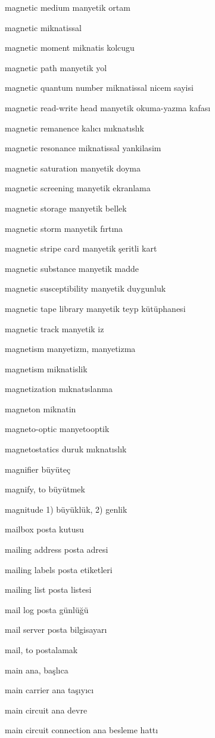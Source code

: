 \documentclass[12pt,fleqn]{article}\usepackage{../../common}
\begin{document}
magnetic medium manyetik ortam

magnetic miknatissal

magnetic moment miknatis kolcugu

magnetic path manyetik yol

magnetic quantum number miknatissal nicem sayisi

magnetic read-write head manyetik okuma-yazma kafası

magnetic remanence kalıcı mıknatıslık

magnetic resonance miknatissal yankilasim

magnetic saturation manyetik doyma

magnetic screening manyetik ekranlama

magnetic storage manyetik bellek

magnetic storm manyetik fırtına

magnetic stripe card manyetik şeritli kart

magnetic substance manyetik madde

magnetic susceptibility manyetik duygunluk

magnetic tape library manyetik teyp kütüphanesi

magnetic track manyetik iz

magnetism manyetizm, manyetizma

magnetism miknatislik

magnetization mıknatıslanma

magneton miknatin

magneto-optic manyetooptik

magnetostatics duruk mıknatıslık

magnifier büyüteç

magnify, to büyütmek

magnitude 1) büyüklük, 2) genlik

mailbox posta kutusu

mailing address posta adresi

mailing labels posta etiketleri

mailing list posta listesi

mail log posta günlüğü

mail server posta bilgisayarı

mail, to postalamak

main ana, başlıca

main carrier ana taşıyıcı

main circuit ana devre

main circuit connection ana besleme hattı
\end{document}
